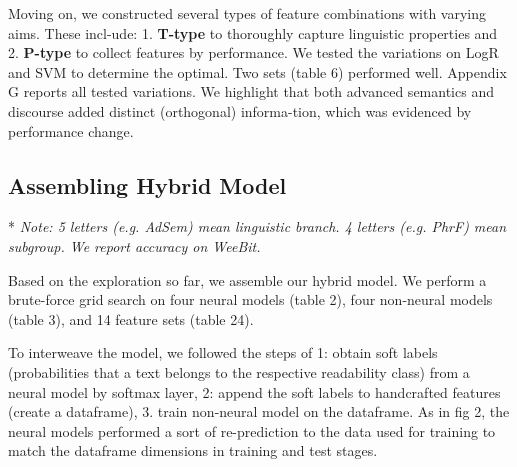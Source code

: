 \documentclass[11pt]{article}
\begin{document}
Moving on, we constructed several types of feature combinations with varying aims. These incl-ude: 1. \textbf{T-type} to thoroughly capture linguistic properties and 2. \textbf{P-type} to collect features by performance. We tested the variations on LogR and SVM to determine the optimal. Two sets (table 6) performed well. Appendix G reports all tested variations. We highlight that both advanced semantics and discourse added distinct (orthogonal) informa-tion, which was evidenced by performance change.



\subsection{Assembling Hybrid Model}

\begin{table}
\begin{tablenotes}
\small
\item[*]\textit{Note: 5 letters (e.g. AdSem) mean linguistic branch. 4 letters (e.g. PhrF) mean subgroup. We report accuracy on WeeBit.}
\end{tablenotes}
\caption{\label{Table 1} Best feature sets.}
\end{table}
Based on the exploration so far, we assemble our hybrid model. We perform a brute-force grid search on four neural models (table 2), four non-neural models (table 3), and 14 feature sets (table 24). 

To interweave the model, we followed the steps of 1: obtain soft labels (probabilities that a text belongs to the respective readability class) from a neural model by softmax layer, 2: append the soft labels to handcrafted features (create a dataframe), 3. train non-neural model on the dataframe. As in fig 2, the neural models performed a sort of re-prediction to the data used for training to match the dataframe dimensions in training and test stages. 
\end{document}
